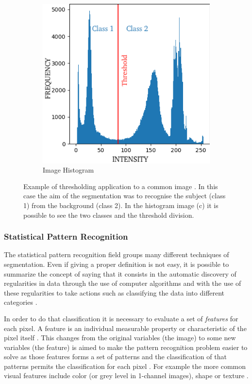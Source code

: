 \documentclass{standalone}
\begin{document}
\begin{figure}[h!]
\begin{subfigure}[b]{0.325\textwidth}
             \includegraphics[scale=0.35]{img/Chap1/THR-histogram.png}
             \caption{Image Histogram}
        \end{subfigure}
		\caption{Example of thresholding application to a common image \cite{IMG:Threshold}. In this case the aim of the segmentation was to recognise the subject (class 1) from the background (class 2). In the histogram image (c) it is possible to see the two classes and the threshold division. 
		        }
		\label{fig:Threshold}
	\end{figure}

\subsubsection{Statistical Pattern Recognition}
The statistical pattern recognition field groups many different techniques of segmentation.
Even if giving a proper definition is not easy, it is possible to summarize the concept of saying that it consists in the automatic discovery of regularities in data through the use of computer algorithms and with the use of these regularities to take actions such as classifying the data into different categories \cite{Bishop}.

In order to do that classification it is necessary to evaluate a set of \textit{features} for each pixel.
A feature is an individual measurable property or characteristic of the pixel itself \cite{Bishop}. This changes from the original variables (the image) to some new variables (the feature) is aimed to make the pattern recognition problem easier to solve \cite{Bishop} as those features forms a set of patterns and the classification of that patterns permits the classification for each pixel \cite{ART:Withey}.
For example the more common visual features include color (or grey level in 1-channel images), shape or texture \cite{ART:Zheng}.
\end{document}
